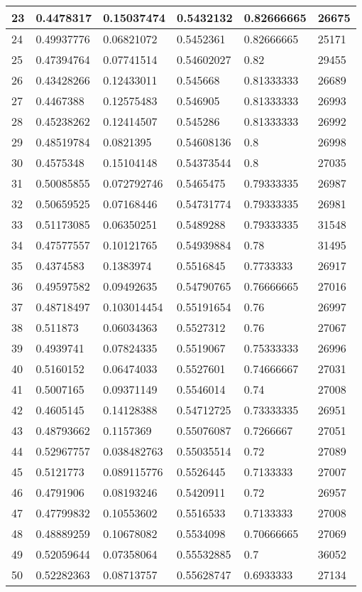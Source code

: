 \begin{longtable}{|l|l|l|l|l|l|}
23 & 0.4478317 & 0.15037474 & 0.5432132 & 0.82666665 & 26675 \\ \hline 
24 & 0.49937776 & 0.06821072 & 0.5452361 & 0.82666665 & 25171 \\ \hline 
25 & 0.47394764 & 0.07741514 & 0.54602027 & 0.82 & 29455 \\ \hline 
26 & 0.43428266 & 0.12433011 & 0.545668 & 0.81333333 & 26689 \\ \hline 
27 & 0.4467388 & 0.12575483 & 0.546905 & 0.81333333 & 26993 \\ \hline 
28 & 0.45238262 & 0.12414507 & 0.545286 & 0.81333333 & 26992 \\ \hline 
29 & 0.48519784 & 0.0821395 & 0.54608136 & 0.8 & 26998 \\ \hline 
30 & 0.4575348 & 0.15104148 & 0.54373544 & 0.8 & 27035 \\ \hline 
31 & 0.50085855 & 0.072792746 & 0.5465475 & 0.79333335 & 26987 \\ \hline 
32 & 0.50659525 & 0.07168446 & 0.54731774 & 0.79333335 & 26981 \\ \hline 
33 & 0.51173085 & 0.06350251 & 0.5489288 & 0.79333335 & 31548 \\ \hline 
34 & 0.47577557 & 0.10121765 & 0.54939884 & 0.78 & 31495 \\ \hline 
35 & 0.4374583 & 0.1383974 & 0.5516845 & 0.7733333 & 26917 \\ \hline 
36 & 0.49597582 & 0.09492635 & 0.54790765 & 0.76666665 & 27016 \\ \hline 
37 & 0.48718497 & 0.103014454 & 0.55191654 & 0.76 & 26997 \\ \hline 
38 & 0.511873 & 0.06034363 & 0.5527312 & 0.76 & 27067 \\ \hline 
39 & 0.4939741 & 0.07824335 & 0.5519067 & 0.75333333 & 26996 \\ \hline 
40 & 0.5160152 & 0.06474033 & 0.5527601 & 0.74666667 & 27031 \\ \hline 
41 & 0.5007165 & 0.09371149 & 0.5546014 & 0.74 & 27008 \\ \hline 
42 & 0.4605145 & 0.14128388 & 0.54712725 & 0.73333335 & 26951 \\ \hline 
43 & 0.48793662 & 0.1157369 & 0.55076087 & 0.7266667 & 27051 \\ \hline 
44 & 0.52967757 & 0.038482763 & 0.55035514 & 0.72 & 27089 \\ \hline 
45 & 0.5121773 & 0.089115776 & 0.5526445 & 0.7133333 & 27007 \\ \hline 
46 & 0.4791906 & 0.08193246 & 0.5420911 & 0.72 & 26957 \\ \hline 
47 & 0.47799832 & 0.10553602 & 0.5516533 & 0.7133333 & 27008 \\ \hline 
48 & 0.48889259 & 0.10678082 & 0.5534098 & 0.70666665 & 27069 \\ \hline 
49 & 0.52059644 & 0.07358064 & 0.55532885 & 0.7 & 36052 \\ \hline 
50 & 0.52282363 & 0.08713757 & 0.55628747 & 0.6933333 & 27134 \\ \hline 
\end{longtable}
